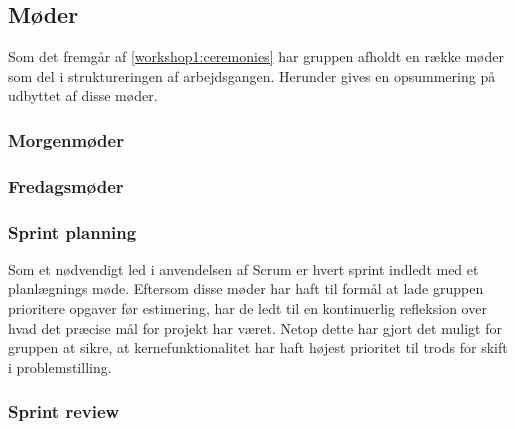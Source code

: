 \subsection{Møder}
Som det fremgår af \cref{workshop1:ceremonies} har gruppen afholdt en række møder som del i struktureringen af arbejdsgangen.
Herunder gives en opsummering på udbyttet af disse møder.
\subsubsection{Morgenmøder}
\subsubsection{Fredagsmøder}
\subsubsection{Sprint planning}
Som et nødvendigt led i anvendelsen af Scrum er hvert sprint indledt med et planlægnings møde.
Eftersom disse møder har haft til formål at lade gruppen prioritere opgaver før estimering, har de ledt til en kontinuerlig refleksion over hvad det præcise mål for projekt har været.
Netop dette har gjort det muligt for gruppen at sikre, at kernefunktionalitet har haft højest prioritet til trods for skift i problemstilling.

\subsubsection{Sprint review}


\label{workshop3:fredag}
%
%
